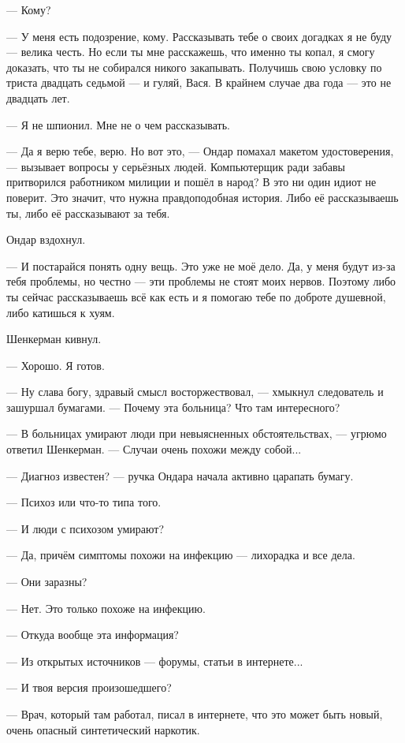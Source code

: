 \documentclass[a4paper,10pt,fleqn]{book}\usepackage{polyglossia}\setdefaultlanguage{english}\setotherlanguage{russian}\defaultfontfeatures{Ligatures=TeX,Mapping=tex-text} \usepackage{xcolor}\definecolor{lightgray}{HTML}{bbbbbb}\color{lightgray}\newcommand{\ml}[3]{\textcolor{black}{#3}}
\begin{document}
--- Кому?

--- У меня есть подозрение, кому.
Рассказывать тебе о своих догадках я не буду --- велика честь.
Но если ты мне расскажешь, что именно ты копал, я смогу доказать, что ты не собирался никого закапывать.
Получишь свою условку по триста двадцать седьмой --- и гуляй, Вася.
В крайнем случае два года --- это не двадцать лет.

--- Я не шпионил.
Мне не о чем рассказывать.

--- Да я верю тебе, верю.
Но вот это, --- Ондар помахал макетом удостоверения, --- вызывает вопросы у серьёзных людей.
Компьютерщик ради забавы притворился работником милиции и пошёл в народ?
В это ни один идиот не поверит.
Это значит, что нужна правдоподобная история.
Либо её рассказываешь ты, либо её рассказывают за тебя.

Ондар вздохнул.

--- И постарайся понять одну вещь.
Это уже не моё дело.
Да, у меня будут из-за тебя проблемы, но честно --- эти проблемы не стоят моих нервов.
Поэтому либо ты сейчас рассказываешь всё как есть и я помогаю тебе по доброте душевной, либо катишься к хуям.

Шенкерман кивнул.

--- Хорошо.
Я готов.

--- Ну слава богу, здравый смысл восторжествовал, --- хмыкнул следователь и зашуршал бумагами.
--- Почему эта больница?
Что там интересного?

--- В больницах умирают люди при невыясненных обстоятельствах, --- угрюмо ответил Шенкерман.
--- Случаи очень похожи между собой...

--- Диагноз известен? --- ручка Ондара начала активно царапать бумагу.

--- Психоз или что-то типа того.

--- И люди с психозом умирают?

--- Да, причём симптомы похожи на инфекцию --- лихорадка и все дела.

--- Они заразны?

--- Нет.
Это только похоже на инфекцию.

--- Откуда вообще эта информация?

--- Из открытых источников --- форумы, статьи в интернете...

--- И твоя версия произошедшего?

--- Врач, который там работал, писал в интернете, что это может быть новый, очень опасный синтетический наркотик.
\end{document}
